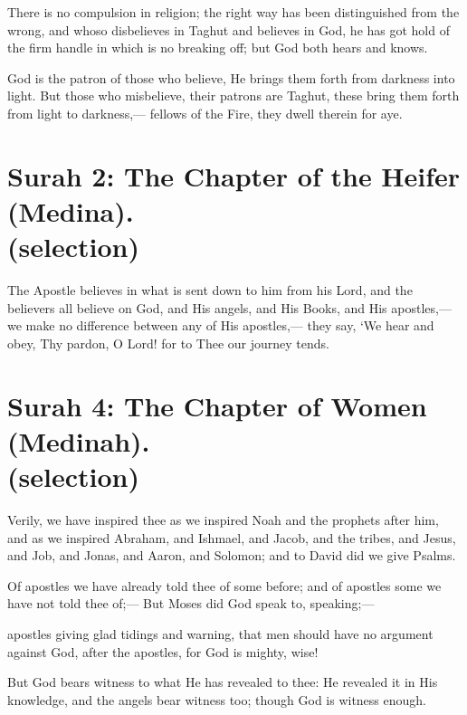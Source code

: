 \documentclass[fontsize=14pt, letterpaper, notitlepage, openany, DIV=12]{scrbook} %
\begin{document}
\noindent[2:256]
There is no compulsion in religion; the right way has been distinguished from the wrong,
and whoso disbelieves in Taghut and believes in God, he has got hold of the firm handle in
which is no breaking off; but God both hears and knows.

\noindent[2:257]
God is the patron of those who believe, He brings them forth from darkness into light.
But those who misbelieve, their patrons are Taghut, these bring them forth from light to
darkness,--- fellows of the Fire, they dwell therein for aye.


\section[Surah 2: The Chapter of the Heifer (Medina).]{Surah 2: The Chapter of the Heifer (Medina).\\ (selection)}


\noindent[2:285]
The Apostle believes in what is sent down to him from his Lord, and the believers all
believe on God, and His angels, and His Books, and His apostles,--- we make no difference
between any of His apostles,--- they say, `We hear and obey, Thy pardon, O Lord! for to Thee
our journey tends.


\section[Surah 4: The Chapter of Women (Medinah).]{Surah 4: The Chapter of Women (Medinah).\\ (selection)}


\noindent[4:163]
Verily, we have inspired thee as we inspired Noah and the prophets after him, and as we
inspired Abraham, and Ishmael, and Jacob, and the tribes, and Jesus, and Job, and Jonas, and
Aaron, and Solomon; and to David did we give Psalms.

\noindent[4:164]
Of apostles we have already told thee of some before; and of apostles some we have not
told thee of;--- But Moses did God speak to, speaking;---

\noindent[4:165]
apostles giving glad tidings and warning, that men should have no argument against God,
after the apostles, for God is mighty, wise!

\noindent[4:166]
But God bears witness to what He has revealed to thee: He revealed it in His knowledge,
and the angels bear witness too; though God is witness enough.


\end{document}
